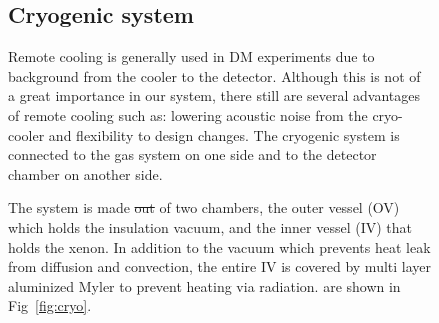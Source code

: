 \begin{figure}[h]
\subsection{Cryogenic system}
\label{subsec:cryo}

Remote cooling is generally used in DM experiments due to background  
from the cooler to the detector. Although this is not of a great 
importance in our system, there still are several advantages of remote 
cooling such as: lowering acoustic noise from the cryo-cooler and 
flexibility to design changes. The cryogenic system is connected to the gas  system on 
one side and to the detector chamber on another side. 

The system is made \sout{out} of two chambers, the outer vessel (OV) which holds 
the insulation vacuum, and the inner vessel (IV) that holds the xenon. In addition 
to the vacuum which prevents heat leak from diffusion and convection, the entire 
IV is covered by multi layer aluminized Myler to prevent heating via radiation.  are shown in Fig~\ref{fig:cryo}. 


\end{figure}
